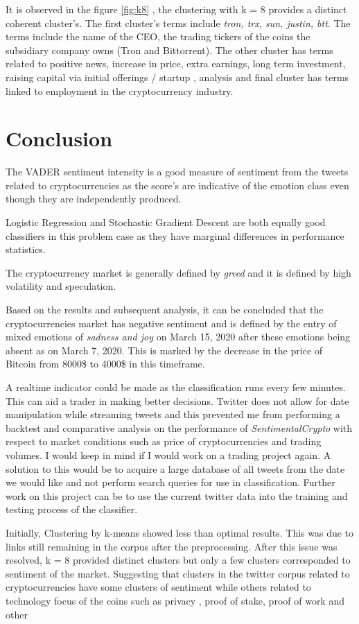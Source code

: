 \documentclass[a4paper, 12pt]{article}
\begin{document}
It is observed in the figure \ref{fig:k8}	, the clustering with k = 8 provides a distinct coherent cluster's. The first cluster's terms include \textit{tron, trx, sun, justin, btt}. The terms include the name of the CEO, the trading tickers of the coins the subsidiary company owns (Tron and Bittorrent). The other cluster has terms related to positive news, increase in price, extra earnings, long term investment, raising capital via initial offerings / startup , analysis and final cluster has terms linked to employment in the cryptocurrency industry.

\pagebreak
\section{Conclusion}
\label{sec:Conclusion}
The VADER sentiment intensity is a good measure of sentiment from the tweets related to cryptocurrencies as the score's are indicative of the emotion class even though they are independently produced.

Logistic Regression and Stochastic Gradient Descent are both equally good classifiers in this problem case as they have marginal differences in performance statistics. 

The cryptocurrency market is generally defined by \textit{greed} and it is defined by high volatility and speculation.

Based on the results and subsequent analysis, it can be concluded that the cryptocurrencies market has negative sentiment and is defined by the entry of mixed emotions of \textit{sadness and joy} on March 15, 2020 after these emotions being absent as on March 7, 2020. This is marked by the decrease in the price of Bitcoin from 8000\$ to 4000\$ in this timeframe. 

A realtime indicator could be made as the classification runs every few minutes. This can aid a trader in making better decisions. Twitter does not allow for date manipulation while streaming tweets and this prevented me from performing a backtest and comparative analysis on the performance of \textit{SentimentalCrypto} with respect to market conditions such as price of cryptocurrencies and trading volumes. 
I would keep in mind if I would work on a trading project again. A solution to this would be to acquire a large database of all tweets from the date we would like and not perform search queries for use in classification. Further work on this project can be to use the current twitter data into the training and testing process of the classifier.

Initially, Clustering by k-means showed less than optimal results. This was due to links still remaining in the corpus after the preprocessing. After this issue was resolved, k = 8 provided distinct clusters but only a few clusters corresponded to sentiment of the market. Suggesting that clusters in the twitter corpus related to cryptocurrencies have some clusters of sentiment while others related to technology focus of the coins such as privacy , proof of stake, proof of work and other


\pagebreak


\end{document}
